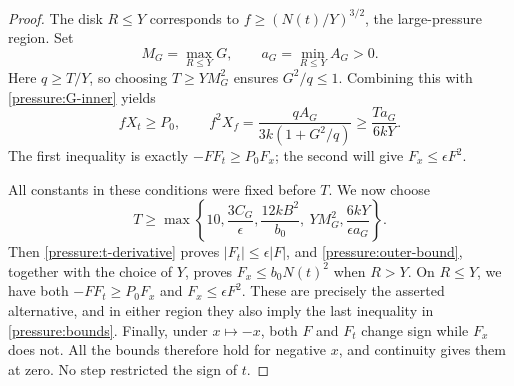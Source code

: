 \begin{proof}
The disk \(R\le Y\) corresponds to
\(f\ge(N(t)/Y)^{3/2}\), the large-pressure region.  Set
\[
 M_G=\max_{R\le Y}G,\qquad a_G=\min_{R\le Y}A_G>0.
\]
Here \(q\ge T/Y\), so choosing \(T\ge YM_G^2\) ensures
\(G^2/q\le1\).  Combining this with \eqref{pressure:G-inner} yields
\[
 fX_t\ge P_0,
 \qquad
 f^2X_f=\frac{qA_G}{3k(1+G^2/q)}
       \ge\frac{Ta_G}{6kY}.
\]
The first inequality is exactly \(-FF_t\ge P_0F_x\); the second will
give \(F_x\le\epsilon F^2\).

All constants in these conditions were fixed before \(T\).  We now choose
\begin{equation}\label{pressure:T-choice}
 T\ge\max\left\{10,\frac{3C_G}{\epsilon},
       \frac{12kB^2}{b_0},\ YM_G^2,
       \frac{6kY}{\epsilon a_G}\right\}.
\end{equation}
Then \eqref{pressure:t-derivative} proves \(|F_t|\le\epsilon|F|\),
and \eqref{pressure:outer-bound}, together with the choice of \(Y\),
proves \(F_x\le b_0N(t)^2\) when \(R>Y\).
On \(R\le Y\), we have both \(-FF_t\ge P_0F_x\) and
\(F_x\le\epsilon F^2\).  These are precisely the asserted alternative,
and in either region they also imply the last inequality in
\eqref{pressure:bounds}.  Finally, under \(x\mapsto-x\), both \(F\) and
\(F_t\) change sign while \(F_x\) does not.  All the bounds therefore
hold for negative \(x\), and continuity gives them at zero.  No step
restricted the sign of \(t\).
\end{proof}
